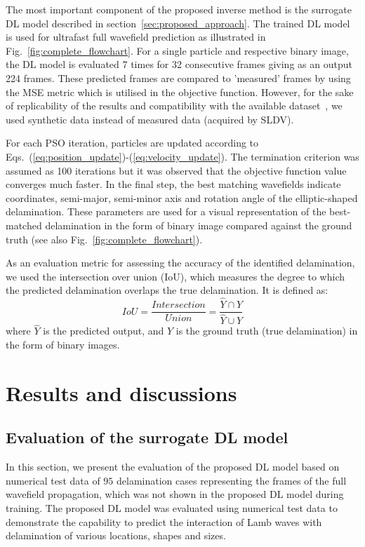 \documentclass[pdflatex,sn-mathphys-num]{sn-jnl}%
\begin{document}
	The most important component of the proposed inverse method is the 
	surrogate DL model described in section~\ref{sec:proposed_approach}.
	The trained DL model is used for ultrafast full wavefield prediction as 
	illustrated in Fig.~\ref{fig:complete_flowchart}.
	For a single particle and respective binary image, the DL model is 
	evaluated 7 times for 32 consecutive frames giving as an output 224 frames. 
	These predicted frames are compared to 'measured' frames by using the MSE 
	metric which is utilised in the objective function.
	However, for the sake of replicability of the results and compatibility 
	with the available dataset~\cite{kudela_pawel_2021_5414555}, we used 
	synthetic data instead of measured data (acquired by SLDV).
	
	For each PSO iteration, particles are updated according to 
	Eqs.~(\ref{eq:position_update})-(\ref{eq:velocity_update}).
	The termination criterion was assumed as 100 iterations but it was observed 
	that the objective function value converges much faster.
	In the final step, the best matching wavefields indicate coordinates, 
	semi-major, semi-minor axis and rotation angle of the elliptic-shaped 
	delamination. 
	These parameters are used for a visual representation of the best-matched 
	delamination in the form of binary image compared against the ground truth 
	(see also Fig.~\ref{fig:complete_flowchart}).
	
	As an evaluation metric for assessing the accuracy of the identified 
	delamination, we used the intersection over union (IoU), which measures the 
	degree to which the predicted delamination overlaps the true delamination. 
	It is defined as:
	\begin{equation}
		IoU=\frac{Intersection}{Union}=\frac{\hat{Y} \cap Y}{\hat{Y} \cup Y}
		\label{eq:iou}
	\end{equation}
	where \(\hat{Y}\) is the predicted output, and \(Y\) is the ground truth 
	(true delamination) in the form of binary images.
	\section{Results and discussions}
	\subsection{Evaluation of the surrogate DL model}
	In this section, we present the evaluation of the proposed DL model based 
	on numerical test data of \(95\) delamination cases representing the frames 
	of the full wavefield propagation, which was not shown in the proposed DL 
	model during training. 
	The proposed DL model was evaluated using numerical test data to 
	demonstrate the capability to predict the interaction of Lamb waves with 
	delamination of various locations, shapes and sizes.
	
\end{document}
